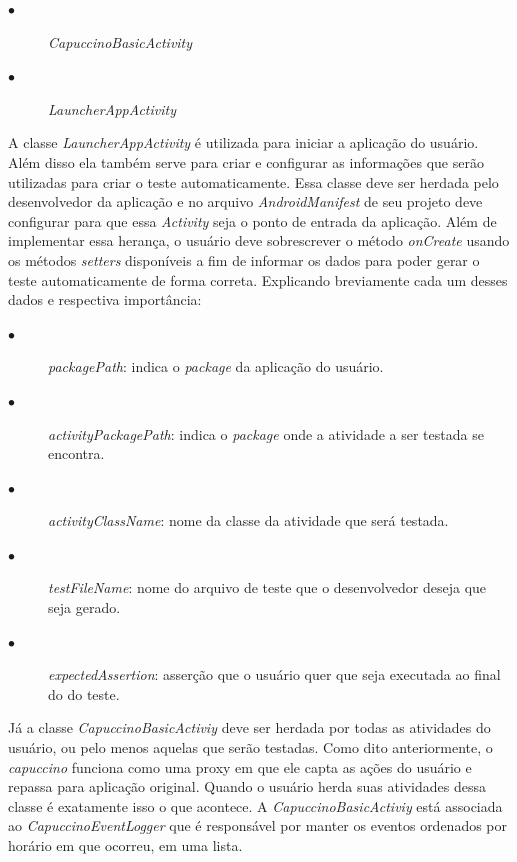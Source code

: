 \documentclass[
    12pt,       %
    openright,      %
    twoside,      %
    a4paper,      %
    english,      %
    french,       %
    spanish,      %
    brazil,       %
    ]{abntex2}
\begin{document}
          \begin{description}
            \item[$\bullet$] \textit{CapuccinoBasicActivity}
            \item[$\bullet$] \textit{LauncherAppActivity}
          \end{description}

          A classe \textit{LauncherAppActivity} é utilizada para iniciar a aplicação do usuário. Além
          disso ela também serve para criar e configurar as informações que serão utilizadas para criar
          o teste automaticamente. Essa classe deve ser herdada pelo desenvolvedor da aplicação e no arquivo
          \textit{AndroidManifest} de seu projeto deve configurar para que essa \textit{Activity} seja
          o ponto de entrada da aplicação. Além de implementar essa herança, o usuário deve sobrescrever o
          método \textit{onCreate} usando os métodos \textit{setters} disponíveis a fim de informar os dados
          para poder gerar o teste automaticamente de forma correta. Explicando breviamente cada um
          desses dados e respectiva importância:

          \begin{description}
            \item[$\bullet$] \textit{packagePath}: indica o \textit{package} da aplicação do usuário.
            \item[$\bullet$] \textit{activityPackagePath}: indica o \textit{package} onde a atividade a
                                                           ser testada se encontra.

            \item[$\bullet$] \textit{activityClassName}: nome da classe da atividade que será testada.
            \item[$\bullet$] \textit{testFileName}: nome do arquivo de teste que o desenvolvedor deseja que seja
                                                    gerado.

            \item[$\bullet$] \textit{expectedAssertion}:  asserção que o usuário quer que seja executada ao final do
                                                          do teste.
          \end{description}

          Já a classe \textit{CapuccinoBasicActiviy} deve ser herdada por todas as atividades do usuário,
          ou pelo menos aquelas que serão testadas. Como dito anteriormente, o \textit{capuccino} funciona
          como uma proxy em que ele capta as ações do usuário e repassa para aplicação original. Quando
          o usuário herda suas atividades dessa classe é exatamente isso o que acontece. A
          \textit{CapuccinoBasicActiviy} está associada ao \textit{CapuccinoEventLogger} que é responsável
          por manter os eventos ordenados por horário em que ocorreu, em uma lista.
\end{document}

